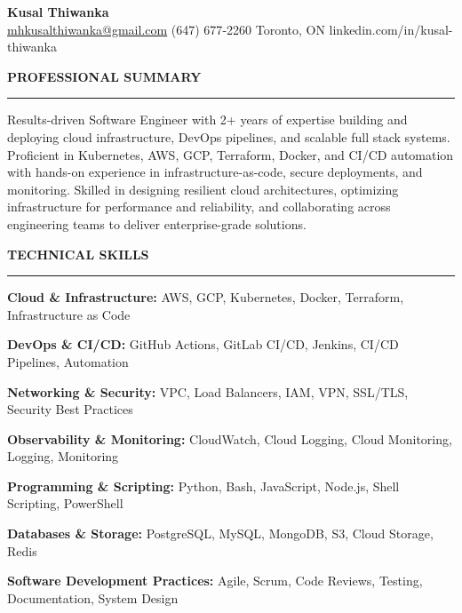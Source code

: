 \documentclass[10pt,letterpaper]{article}
\begin{document}
\begin{center}
{\LARGE\textbf{Kusal Thiwanka}}\\[3pt]
\href{mailto:mhkusalthiwanka@gmail.com}{mhkusalthiwanka@gmail.com}\hspace{2em}%
(647) 677{-}2260\hspace{2em}%
Toronto, ON\hspace{2em}
linkedin.com/in/kusal-thiwanka
\end{center}

\vspace{6pt}

\textbf{PROFESSIONAL SUMMARY}\\[-8pt]
\noindent\rule{\textwidth}{1pt}

\vspace{-2pt}

Results-driven Software Engineer with 2+ years of expertise building and deploying cloud infrastructure, DevOps pipelines, and scalable full stack systems. Proficient in Kubernetes, AWS, GCP, Terraform, Docker, and CI/CD automation with hands-on experience in infrastructure-as-code, secure deployments, and monitoring. Skilled in designing resilient cloud architectures, optimizing infrastructure for performance and reliability, and collaborating across engineering teams to deliver enterprise-grade solutions.

\vspace{8pt}

\textbf{TECHNICAL SKILLS}\\[-8pt]
\noindent\rule{\textwidth}{1pt}

\vspace{-2pt}

\textbf{Cloud \& Infrastructure:} AWS, GCP, Kubernetes, Docker, Terraform, Infrastructure as Code

\textbf{DevOps \& CI/CD:} GitHub Actions, GitLab CI/CD, Jenkins, CI/CD Pipelines, Automation

\textbf{Networking \& Security:} VPC, Load Balancers, IAM, VPN, SSL/TLS, Security Best Practices

\textbf{Observability \& Monitoring:} CloudWatch, Cloud Logging, Cloud Monitoring, Logging, Monitoring

\textbf{Programming \& Scripting:} Python, Bash, JavaScript, Node.js, Shell Scripting, PowerShell

\textbf{Databases \& Storage:} PostgreSQL, MySQL, MongoDB, S3, Cloud Storage, Redis

\textbf{Software Development Practices:} Agile, Scrum, Code Reviews, Testing, Documentation, System Design
\end{document}

